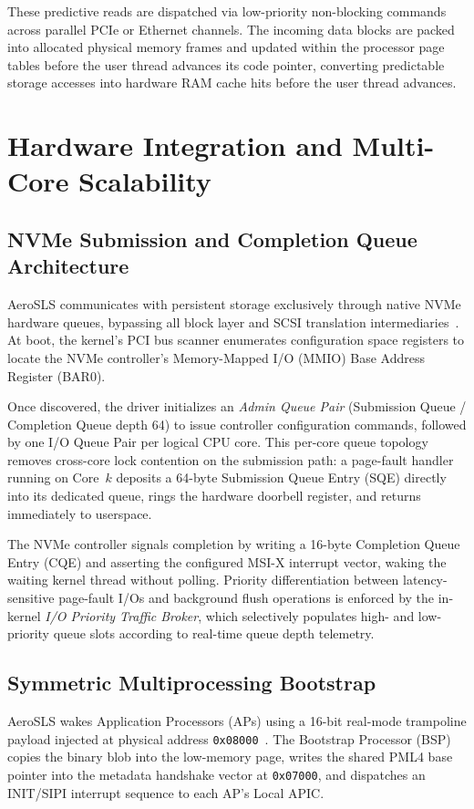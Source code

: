 \documentclass[sigconf]{acmart}
\begin{document}
These predictive reads are dispatched via low-priority
non-blocking commands across parallel PCIe or Ethernet channels.
The incoming data blocks are packed into allocated physical memory
frames and updated within the processor page tables before the
user thread advances its code pointer, converting predictable storage accesses into
hardware RAM cache hits before the user thread advances.

\section{Hardware Integration and Multi-Core Scalability}
\label{sec:hardware}

\subsection{NVMe Submission and Completion Queue Architecture}
AeroSLS communicates with persistent storage exclusively through
native NVMe hardware queues, bypassing all block layer and SCSI
translation intermediaries~\cite{nvme_spec}.  At boot, the
kernel's PCI bus scanner enumerates configuration space
registers to locate the NVMe controller's Memory-Mapped I/O
(MMIO) Base Address Register (BAR0).

Once discovered, the driver initializes an \emph{Admin Queue
Pair} (Submission Queue / Completion Queue depth 64) to issue
controller configuration commands, followed by one I/O Queue
Pair per logical CPU core.  This per-core queue topology
removes cross-core lock contention on the submission path: a
page-fault handler running on Core~$k$ deposits a 64-byte
Submission Queue Entry (SQE) directly into its dedicated queue,
rings the hardware doorbell register, and returns immediately to
userspace.

The NVMe controller signals completion by writing a 16-byte
Completion Queue Entry (CQE) and asserting the configured MSI-X
interrupt vector, waking the waiting kernel thread without
polling.  Priority differentiation between latency-sensitive
page-fault I/Os and background flush operations is enforced by
the in-kernel \emph{I/O Priority Traffic Broker}, which
selectively populates high- and low-priority queue slots
according to real-time queue depth telemetry.

\subsection{Symmetric Multiprocessing Bootstrap}
AeroSLS wakes Application Processors (APs) using a
16-bit real-mode trampoline payload injected at physical address
\texttt{0x08000}~\cite{intel_64}.  The Bootstrap Processor (BSP)
copies the binary blob into the low-memory page, writes the
shared PML4 base pointer into the metadata handshake vector at
\texttt{0x07000}, and dispatches an INIT/SIPI interrupt sequence
to each AP's Local APIC.
\end{document}
